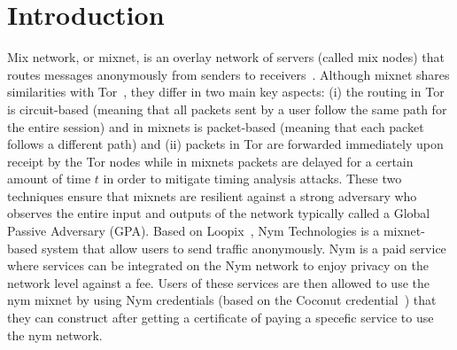 \section{Introduction}

Mix network, or mixnet, is an overlay network of servers (called mix nodes) that routes messages anonymously from senders
to receivers~\cite{chaum-mix,cypherpunk-remailer,piotrowska2017loopix,nym-network-whitepaper,minion-design, van2015vuvuzela,mixmaster-spec,chaum2016cmix}. Although mixnet shares similarities with Tor~\cite{onion-routing96}, they differ in two main key aspects: (i) the routing in Tor is circuit-based (meaning that all packets sent by a user follow the same path for the entire session) and in mixnets is packet-based (meaning that each packet follows a different path) and (ii) packets in Tor are forwarded immediately upon receipt by the Tor nodes while in mixnets packets are delayed for a certain amount of time $t$ in order to mitigate timing analysis attacks. These two techniques ensure that mixnets are resilient against a strong adversary who observes the entire input and outputs of the network typically called a Global Passive Adversary (GPA).
Based on Loopix~\cite{piotrowska2017loopix}, Nym Technologies is a mixnet-based system that allow users to send traffic anonymously.
Nym is a paid service where services can be integrated on the Nym network to enjoy privacy on the network level against a fee. Users of these services are then allowed to use the nym mixnet by using Nym credentials (based on the Coconut credential~\cite{coconut}) that they can construct after getting a certificate of paying a specefic service to use the nym network. 



